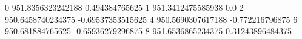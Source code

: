 0 951.8356323242188 0.494384765625
1 951.3412475585938 0.0
2 950.6458740234375 -0.69537353515625
4 950.5690307617188 -0.772216796875
6 950.681884765625 -0.65936279296875
8 951.6536865234375 0.31243896484375
